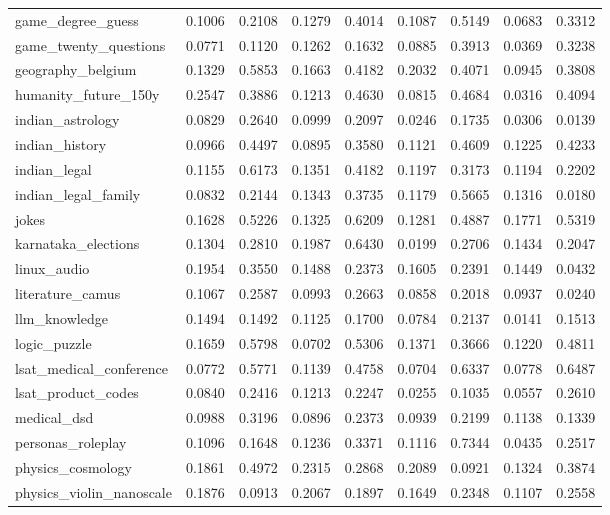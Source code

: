 \begin{landscape}
\begin{longtable}{@{}p{3.8cm}cccccccc@{}}
game\_degree\_guess & 0.1006 & 0.2108 & 0.1279 & 0.4014 & 0.1087 & 0.5149 & 0.0683 & 0.3312 \\
game\_twenty\_questions & 0.0771 & 0.1120 & 0.1262 & 0.1632 & 0.0885 & 0.3913 & 0.0369 & 0.3238 \\
geography\_belgium & 0.1329 & 0.5853 & 0.1663 & 0.4182 & 0.2032 & 0.4071 & 0.0945 & 0.3808 \\
humanity\_future\_150y & 0.2547 & 0.3886 & 0.1213 & 0.4630 & 0.0815 & 0.4684 & 0.0316 & 0.4094 \\
indian\_astrology & 0.0829 & 0.2640 & 0.0999 & 0.2097 & 0.0246 & 0.1735 & 0.0306 & 0.0139 \\
indian\_history & 0.0966 & 0.4497 & 0.0895 & 0.3580 & 0.1121 & 0.4609 & 0.1225 & 0.4233 \\
indian\_legal & 0.1155 & 0.6173 & 0.1351 & 0.4182 & 0.1197 & 0.3173 & 0.1194 & 0.2202 \\
indian\_legal\_family & 0.0832 & 0.2144 & 0.1343 & 0.3735 & 0.1179 & 0.5665 & 0.1316 & 0.0180 \\
jokes & 0.1628 & 0.5226 & 0.1325 & 0.6209 & 0.1281 & 0.4887 & 0.1771 & 0.5319 \\
karnataka\_elections & 0.1304 & 0.2810 & 0.1987 & 0.6430 & 0.0199 & 0.2706 & 0.1434 & 0.2047 \\
linux\_audio & 0.1954 & 0.3550 & 0.1488 & 0.2373 & 0.1605 & 0.2391 & 0.1449 & 0.0432 \\
literature\_camus & 0.1067 & 0.2587 & 0.0993 & 0.2663 & 0.0858 & 0.2018 & 0.0937 & 0.0240 \\
llm\_knowledge & 0.1494 & 0.1492 & 0.1125 & 0.1700 & 0.0784 & 0.2137 & 0.0141 & 0.1513 \\
logic\_puzzle & 0.1659 & 0.5798 & 0.0702 & 0.5306 & 0.1371 & 0.3666 & 0.1220 & 0.4811 \\
lsat\_medical\_conference & 0.0772 & 0.5771 & 0.1139 & 0.4758 & 0.0704 & 0.6337 & 0.0778 & 0.6487 \\
lsat\_product\_codes & 0.0840 & 0.2416 & 0.1213 & 0.2247 & 0.0255 & 0.1035 & 0.0557 & 0.2610 \\
medical\_dsd & 0.0988 & 0.3196 & 0.0896 & 0.2373 & 0.0939 & 0.2199 & 0.1138 & 0.1339 \\
personas\_roleplay & 0.1096 & 0.1648 & 0.1236 & 0.3371 & 0.1116 & 0.7344 & 0.0435 & 0.2517 \\
physics\_cosmology & 0.1861 & 0.4972 & 0.2315 & 0.2868 & 0.2089 & 0.0921 & 0.1324 & 0.3874 \\
physics\_violin\_nanoscale & 0.1876 & 0.0913 & 0.2067 & 0.1897 & 0.1649 & 0.2348 & 0.1107 & 0.2558 \\

\end{longtable}
\end{landscape}
